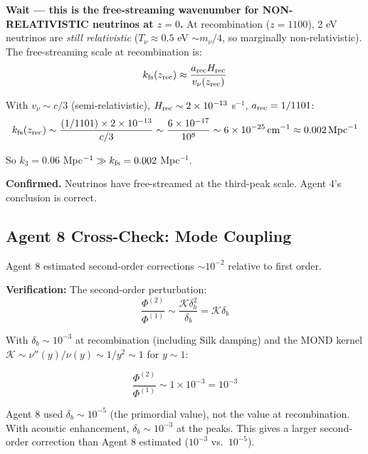 \documentclass[11pt,a4paper]{article}
\begin{document}
\textbf{Wait --- this is the free-streaming wavenumber for NON-RELATIVISTIC neutrinos at $z = 0$.} At recombination ($z = 1100$), 2 eV neutrinos are \emph{still relativistic} ($T_\nu \approx 0.5$ eV $\sim m_\nu/4$, so marginally non-relativistic). The free-streaming scale at recombination is:
\begin{equation}
k_{\rm fs}(z_{\rm rec}) \approx \frac{a_{\rm rec}H_{\rm rec}}{v_\nu(z_{\rm rec})}
\end{equation}

With $v_\nu \sim c/3$ (semi-relativistic), $H_{\rm rec} \sim 2\times10^{-13}$ s$^{-1}$, $a_{\rm rec} = 1/1101$:
\begin{equation}
k_{\rm fs}(z_{\rm rec}) \sim \frac{(1/1101)\times2\times10^{-13}}{c/3} \sim \frac{6\times10^{-17}}{10^{8}} \sim 6\times10^{-25}\,\text{cm}^{-1} \approx 0.002\,\text{Mpc}^{-1}
\end{equation}

So $k_3 = 0.06$ Mpc$^{-1} \gg k_{\rm fs} = 0.002$ Mpc$^{-1}$.

\textbf{Confirmed.} Neutrinos have free-streamed at the third-peak scale. Agent 4's conclusion is correct.

\subsection{Agent 8 Cross-Check: Mode Coupling}

Agent 8 estimated second-order corrections $\sim 10^{-2}$ relative to first order.

\textbf{Verification:} The second-order perturbation:
\begin{equation}
\frac{\Phi^{(2)}}{\Phi^{(1)}} \sim \frac{\mathcal{K}\delta_b^2}{\delta_b} = \mathcal{K}\delta_b
\end{equation}

With $\delta_b \sim 10^{-3}$ at recombination (including Silk damping) and the MOND kernel $\mathcal{K} \sim \nu''(y)/\nu(y) \sim 1/y^2 \sim 1$ for $y \sim 1$:

\begin{equation}
\frac{\Phi^{(2)}}{\Phi^{(1)}} \sim 1 \times 10^{-3} = 10^{-3}
\end{equation}

Agent 8 used $\delta_b \sim 10^{-5}$ (the primordial value), not the value at recombination. With acoustic enhancement, $\delta_b \sim 10^{-3}$ at the peaks. This gives a larger second-order correction than Agent 8 estimated ($10^{-3}$ vs.\ $10^{-5}$).
\end{document}
